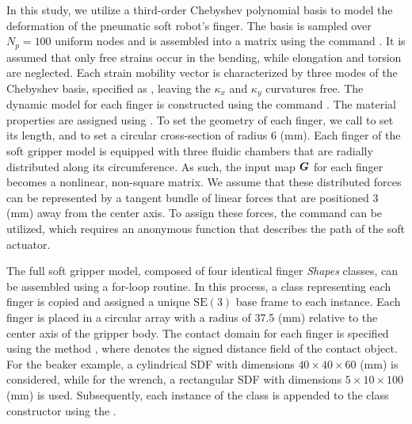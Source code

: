 In this study, we utilize a third-order Chebyshev polynomial basis to model the deformation of the pneumatic soft robot's finger. The basis is sampled over $N_p = 100$ uniform nodes and is assembled into a matrix using the command . It is assumed that only free strains occur in the bending, while elongation and torsion are neglected. Each strain mobility vector is characterized by three modes of the Chebyshev basis, specified as , leaving the $\kappa_x$ and $\kappa_y$ curvatures free. The dynamic model for each finger is constructed using the command . The material properties are assigned using . To set the geometry of each finger, we call  to set its length, and  to set a circular cross-section of radius $6$ (mm). Each finger of the soft gripper model is equipped with three fluidic chambers that are radially distributed along its circumference. As such, the input map ${\boldsymbol{G}}$ for each finger becomes a nonlinear, non-square matrix. We assume that these distributed forces can be represented by a tangent bundle of linear forces that are positioned $3$ (mm) away from the center axis. To assign these forces, the  command can be utilized, which requires an anonymous function  that describes the path of the soft actuator. %





The full soft gripper model, composed of four identical finger \textit{Shapes} classes, can be assembled using a for-loop routine. In this process, a class representing each finger is copied and assigned a unique $\textrm{SE}(3)$ base frame to each instance. Each finger is placed in a circular array with a radius of 37.5 (mm) relative to the center axis of the gripper body. The contact domain for each finger is specified using the method , where  denotes the signed distance field of the contact object. For the beaker example, a cylindrical SDF with dimensions $40 \times 40 \times 60$ (mm) is considered, while for the wrench, a rectangular SDF with dimensions $5 \times 10 \times 100$ (mm) is used. Subsequently, each instance of the  class is appended to the  class constructor using the .

